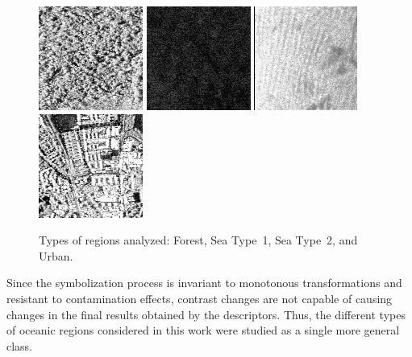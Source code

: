 \documentclass{isprs}
\begin{document}
	\begin{figure}[hbt]
		\centering
		\includegraphics[width=.23\linewidth]{Figures/guatemalaflorest}
		\includegraphics[width=.23\linewidth]{Figures/Cape1}
		\includegraphics[width=.23\linewidth]{Figures/Cape2}
		\includegraphics[width=.23\linewidth]{Figures/munichUrban}	
		\caption{Types of regions analyzed: Forest, Sea Type~1, Sea Type~2, and Urban.}\label{fig:RegionsSAR}
	\end{figure} 
	
	Since the symbolization process is invariant to monotonous transformations and resistant to contamination effects, contrast chan\-ges are not capable of causing changes in the final results obtained by the descriptors.
	Thus, the different types of oceanic regions considered in this work were studied as a single more general class.
	
	
\end{document}
